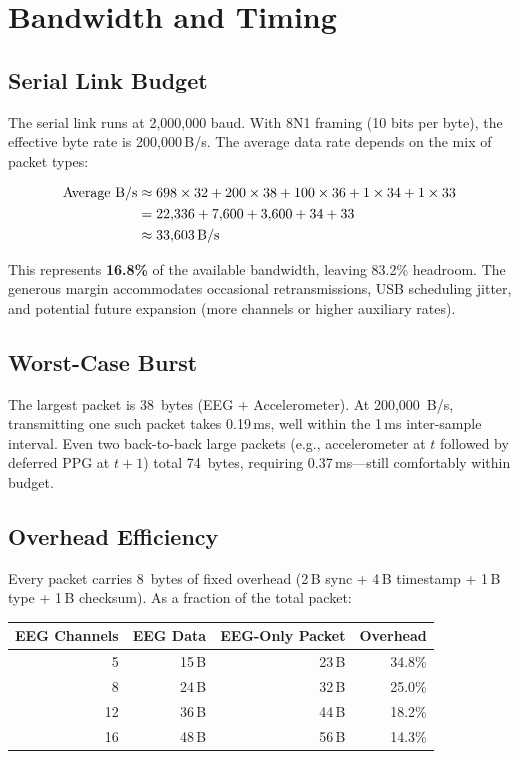 \documentclass[11pt,a4paper]{article}
\begin{document}
\section{Bandwidth and Timing}
\label{sec:bandwidth}

\subsection{Serial Link Budget}

The serial link runs at 2,000,000 baud.  With 8N1 framing (10 bits per byte), the effective byte rate is 200,000\,B/s.  The average data rate depends on the mix of packet types:

\begin{align}
\text{Average B/s} &\approx 698 \times 32 + 200 \times 38 + 100 \times 36 + 1 \times 34 + 1 \times 33 \nonumber\\
    &= 22{,}336 + 7{,}600 + 3{,}600 + 34 + 33 \nonumber\\
    &\approx 33{,}603 \text{\,B/s} \nonumber
\end{align}

This represents \textbf{16.8\%} of the available bandwidth, leaving 83.2\% headroom.  The generous margin accommodates occasional retransmissions, USB scheduling jitter, and potential future expansion (more channels or higher auxiliary rates).

\subsection{Worst-Case Burst}

The largest packet is 38~bytes (EEG + Accelerometer).  At 200,000~B/s, transmitting one such packet takes 0.19\,ms, well within the 1\,ms inter-sample interval.  Even two back-to-back large packets (e.g., accelerometer at $t$ followed by deferred PPG at $t+1$) total 74~bytes, requiring 0.37\,ms---still comfortably within budget.

\subsection{Overhead Efficiency}

Every packet carries 8~bytes of fixed overhead (2\,B sync + 4\,B timestamp + 1\,B type + 1\,B checksum).  As a fraction of the total packet:

\medskip
\begin{tabular}{rrrr}
\toprule
\textbf{EEG Channels} & \textbf{EEG Data} & \textbf{EEG-Only Packet} & \textbf{Overhead} \\
\midrule
5  & 15\,B & 23\,B & 34.8\% \\
8  & 24\,B & 32\,B & 25.0\% \\
12 & 36\,B & 44\,B & 18.2\% \\
16 & 48\,B & 56\,B & 14.3\% \\
\bottomrule
\end{tabular}
\medskip
\end{document}
